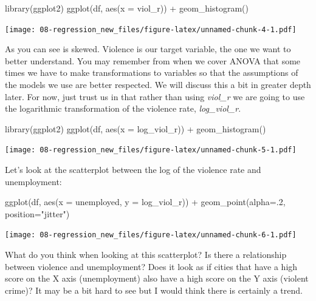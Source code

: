 \documentclass[
]{book}
\newenvironment{Shaded}{\begin{snugshade}}{\end{snugshade}}
\newcommand{\AttributeTok}[1]{\textcolor[rgb]{0.77,0.63,0.00}{#1}}
\newcommand{\DecValTok}[1]{\textcolor[rgb]{0.00,0.00,0.81}{#1}}
\newcommand{\FunctionTok}[1]{\textcolor[rgb]{0.00,0.00,0.00}{#1}}
\newcommand{\NormalTok}[1]{#1}
\newcommand{\SpecialCharTok}[1]{\textcolor[rgb]{0.00,0.00,0.00}{#1}}
\newcommand{\StringTok}[1]{\textcolor[rgb]{0.31,0.60,0.02}{#1}}
\begin{document}
\begin{Shaded}
\begin{Highlighting}[]
\FunctionTok{library}\NormalTok{(ggplot2)}
\FunctionTok{ggplot}\NormalTok{(df, }\FunctionTok{aes}\NormalTok{(}\AttributeTok{x =}\NormalTok{ viol\_r)) }\SpecialCharTok{+}
  \FunctionTok{geom\_histogram}\NormalTok{()}
\end{Highlighting}
\end{Shaded}

\texttt{[image: 08-regression\_new\_files/figure-latex/unnamed-chunk-4-1.pdf]}

As you can see is skewed. Violence is our target variable, the one we want to better understand. You may remember from when we cover ANOVA that some times we have to make transformations to variables so that the assumptions of the models we use are better respected. We will discuss this a bit in greater depth later. For now, just trust us in that rather than using \emph{viol\_r} we are going to use the logarithmic transformation of the violence rate, \emph{log\_viol\_r}.

\begin{Shaded}
\begin{Highlighting}[]
\FunctionTok{library}\NormalTok{(ggplot2)}
\FunctionTok{ggplot}\NormalTok{(df, }\FunctionTok{aes}\NormalTok{(}\AttributeTok{x =}\NormalTok{ log\_viol\_r)) }\SpecialCharTok{+}
  \FunctionTok{geom\_histogram}\NormalTok{()}
\end{Highlighting}
\end{Shaded}

\texttt{[image: 08-regression\_new\_files/figure-latex/unnamed-chunk-5-1.pdf]}

Let's look at the scatterplot between the log of the violence rate and unemployment:

\begin{Shaded}
\begin{Highlighting}[]
\FunctionTok{ggplot}\NormalTok{(df, }\FunctionTok{aes}\NormalTok{(}\AttributeTok{x =}\NormalTok{ unemployed, }\AttributeTok{y =}\NormalTok{ log\_viol\_r)) }\SpecialCharTok{+}
  \FunctionTok{geom\_point}\NormalTok{(}\AttributeTok{alpha=}\NormalTok{.}\DecValTok{2}\NormalTok{, }\AttributeTok{position=}\StringTok{"jitter"}\NormalTok{) }
\end{Highlighting}
\end{Shaded}

\texttt{[image: 08-regression\_new\_files/figure-latex/unnamed-chunk-6-1.pdf]}

What do you think when looking at this scatterplot? Is there a relationship between violence and unemployment? Does it look as if cities that have a high score on the X axis (unemployment) also have a high score on the Y axis (violent crime)? It may be a bit hard to see but I would think there is certainly a trend.
\end{document}
